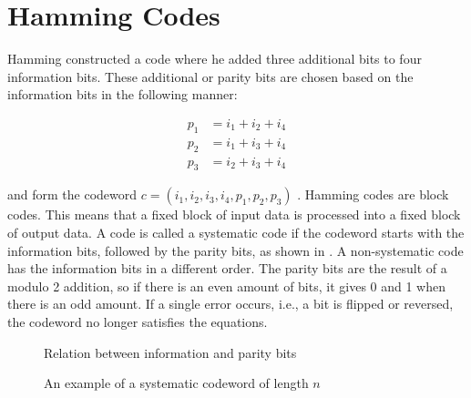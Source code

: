 \documentclass[../main.tex]{subfiles}
\begin{document}
    \section{Hamming Codes}

    Hamming constructed a code where he added three additional bits to four information bits. These additional or parity bits are chosen based on the information bits in the following manner:

    \begin{align*}
        p_1 &= i_1 + i_2 + i_4\\
        p_2 &= i_1 + i_3 + i_4\\
        p_3 &= i_2 + i_3 + i_4
    \end{align*}

    \noindent
    and form the codeword $c=(i_1, i_2, i_3, i_4, p_1, p_2, p_3)$ . Hamming codes are block codes. This means that a fixed block of input data is processed into a fixed block of output data. A code is called a systematic code if the codeword starts with the information bits, followed by the parity bits, as shown in . A non-systematic code has the information bits in a different order. The parity bits are the result of a modulo 2 addition, so if there is an even amount of bits, it gives 0 and 1 when there is an odd amount. If a single error occurs, i.e., a bit is flipped or reversed, the codeword no longer satisfies the equations.

    \begin{figure}[htp]
        \centering
        \caption{Relation between information and parity bits}
        \label{fig:information_and_parity_bits}
    \end{figure}

    \begin{figure}[htp]
        \centering
        \caption{An example of a systematic codeword of length $n$}
        \label{fig:systematic_codeword}
    \end{figure}
\end{document}
